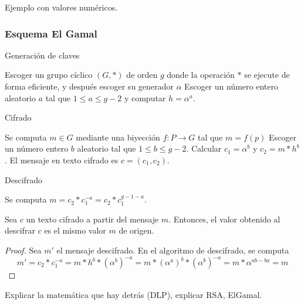 \begin{example}
	Ejemplo con valores numéricos.
\end{example}

\subsubsection{Esquema El Gamal}

\begin{algorithm}
	\caption{Generación de claves}\label{alg:1}
	Escoger un grupo cíclico $(G, *)$ de orden $g$ donde la operación $*$ se ejecute de forma eficiente, y después escoger su generador $\alpha$\;
	Escoger un número entero aleatorio $a$ tal que $1 \leq a \leq g - 2$ y computar $h = \alpha^a$.
\end{algorithm}

\begin{algorithm}
	\caption{Cifrado}\label{alg:2}
	Se computa $m \in G$ mediante una biyección $f : P \rightarrow G$ tal que $m = f(p)$\;
	Escoger un número entero $b$ aleatorio tal que $1 \leq b \leq g - 2$.
	Calcular $c_1 = \alpha^b$ y $c_2 = m*h^b$.
	El mensaje en texto cifrado es $c = (c_1, c_2)$.
\end{algorithm}

\begin{algorithm}
	\caption{Descifrado}\label{alg:3}
	Se computa $m = c_2 * c_1^{-a} = c_2 * c_1^{g - 1 - a}$.
\end{algorithm}

\begin{theorem}
	Sea $c$ un texto cifrado a partir del mensaje $m$. Entonces, el valor obtenido al descifrar $c$ es el mismo valor $m$ de origen.
\end{theorem}

\begin{proof}
	Sea $m'$ el mensaje descifrado. En el algoritmo de descifrado, se computa
	\[m' = c_2*c_1^{-a} = m*h^b*(\alpha^b)^{-a} = m*(\alpha^a)^b*(\alpha^b)^{-a} = m*\alpha^{ab-ba} = m\]
\end{proof}

Explicar la matemática que hay detrás (DLP), explicar RSA, ElGamal.

